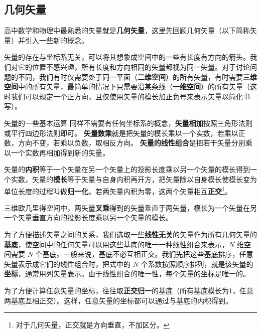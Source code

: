 
\begin{issues}
\issueDraft
\end{issues}

\subsection{几何矢量}
高中数学和物理中最熟悉的矢量就是\textbf{几何矢量}，这里先回顾几何矢量（以下简称矢量）并引入一些新的概念。

矢量的存在与坐标系无关，可以将其想象成空间中的一些有长度有方向的箭头。我们对它的位置不感兴趣，所有长度和方向相同的矢量都视为同一矢量。对于讨论问题的不同，我们有时仅需要处于同一平面（\textbf{二维空间}）的所有矢量，有时需要\textbf{三维空间}中的所有矢量，最简单的情况下只需要沿某条线（\textbf{一维空间}）的所有矢量（这时我们可以规定一个正方向，且仅使用矢量的模长加正负号来表示矢量以简化书写）。

矢量的一些基本运算 同样不需要有任何坐标系的概念，\textbf{矢量相加}按照三角形法则或平行四边形法则即可。
\textbf{矢量数乘}就是把矢量的模长乘以一个实数，若乘以正数，方向不变，若乘以负数，取相反方向。 \textbf{矢量的线性组合}是把若干矢量分别乘以一个实数再相加得到新的矢量。

矢量的\textbf{内积}等于一个矢量在另一个矢量上的投影长度乘以另一个矢量的模长得到一个实数，矢量的\textbf{模长}等于矢量与自身内积再开方，把矢量除以自身模长使模长变为单位长度的过程叫做\textbf{归一化}。若两矢量内积为零，这两个矢量相互\textbf{正交}\footnote{对于几何矢量，正交就是方向垂直，不加区分。}。

三维欧几里得空间中，两矢量\textbf{叉乘}得到的矢量垂直于两矢量，模长为一个矢量在另一个矢量垂直方向的投影长度乘以另一个矢量的模长。

为了方便描述矢量之间的关系，我们选取一些\textbf{线性无关}的矢量作为所有几何矢量的\textbf{基底}，使空间中的任何矢量可以用这些基底的唯一一种线性组合来表示，$N$ 维空间需要 $N$ 个基底。一般来说，基底不必互相正交。我们先把这些基底排序，任意矢量表示成它们的线性组合时，把式中的 $N$ 个系数按照顺序排列，就是该矢量的\textbf{坐标}，通常用列矢量表示。由于线性组合的唯一性，每个矢量的坐标是唯一的。

为了方便计算任意矢量的坐标，往往取\textbf{正交归一}的基底（所有基底模长为1，任意两基底互相正交）。这样，任意矢量的坐标都可以通过与基底的内积得到。

